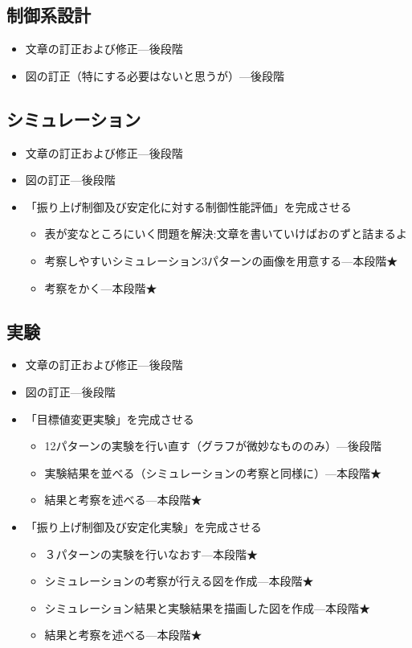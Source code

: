 	\subsection{制御系設計}
		\begin{itemize}
		  \item 文章の訂正および修正---後段階
		  \item 図の訂正（特にする必要はないと思うが）---後段階
		\end{itemize}
	\subsection{シミュレーション}
		\begin{itemize}
		  \item 文章の訂正および修正---後段階
		  \item 図の訂正---後段階
		  \item 「振り上げ制御及び安定化に対する制御性能評価」を完成させる
		  \begin{itemize}
		    \item 表が変なところにいく問題を解決:文章を書いていけばおのずと詰まるよ
		    \item 考察しやすいシミュレーション3パターンの画像を用意する---本段階★
		   	\item 考察をかく---本段階★
		  \end{itemize}
		\end{itemize}
	\subsection{実験}
		\begin{itemize}
		  \item 文章の訂正および修正---後段階
		  \item 図の訂正---後段階
		  \item 「目標値変更実験」を完成させる
		   \begin{itemize}
		     \item 12パターンの実験を行い直す（グラフが微妙なもののみ）---後段階
		     \item 実験結果を並べる（シミュレーションの考察と同様に）---本段階★
		     \item 結果と考察を述べる---本段階★
		  \end{itemize}
		  \item 「振り上げ制御及び安定化実験」を完成させる
		  	\begin{itemize}
		  	  \item ３パターンの実験を行いなおす---本段階★
		  	  \item シミュレーションの考察が行える図を作成---本段階★
		  	  \item シミュレーション結果と実験結果を描画した図を作成---本段階★
		  	  \item 結果と考察を述べる---本段階★
		  	\end{itemize}
		\end{itemize}
